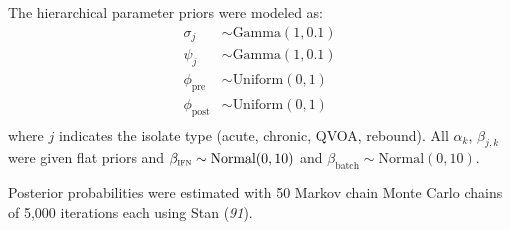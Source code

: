 \documentclass[12pt]{article}
\newcommand{\stanRef}{\textit{91}}
\begin{document}
The hierarchical parameter priors were modeled as:
  \begin{align*}
    \sigma_j & \sim \text{Gamma}(1,0.1)\\
    \psi_j & \sim \text{Gamma}(1,0.1)\\
    \phi_{\text{pre}} & \sim \text{Uniform}(0,1)\\
    \phi_{\text{post}} & \sim \text{Uniform}(0,1)\\
  \end{align*}
where $j$ indicates the isolate type (acute, chronic, QVOA, rebound). All $\alpha_k$, $\beta_{j,k}$ were given flat priors and $\beta_{\text{\textsc{ifn}}}\sim\text{Normal}(0,10)$ and $\beta_{\text{batch}}\sim\text{Normal}(0,10)$.

Posterior probabilities were estimated with 50 Markov chain Monte Carlo chains of 5,000 iterations each using Stan (\stanRef{}).
\end{document}
